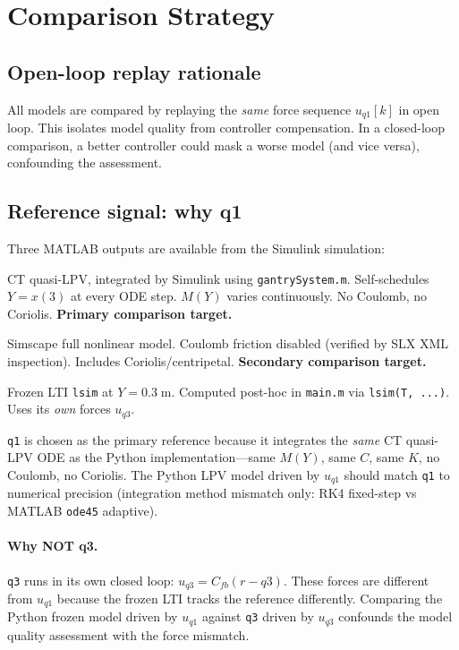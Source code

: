 \documentclass[11pt,a4paper]{article}
\begin{document}
\section{Comparison Strategy}
\label{sec:comparison}

\subsection{Open-loop replay rationale}

All models are compared by replaying the \emph{same} force sequence $u_{q1}[k]$ in open loop.
This isolates model quality from controller compensation. In a closed-loop comparison, a better
controller could mask a worse model (and vice versa), confounding the assessment.

\subsection{Reference signal: why q1}
\label{sec:why_q1}

Three MATLAB outputs are available from the Simulink simulation:

\begin{description}[nosep]
\item[\texttt{q1}] CT quasi-LPV, integrated by Simulink using \texttt{gantrySystem.m}.
  Self-schedules $Y = x(3)$ at every ODE step. $M(Y)$ varies continuously. No Coulomb, no
  Coriolis. \textbf{Primary comparison target.}
\item[\texttt{q}] Simscape full nonlinear model. Coulomb friction disabled (verified by SLX
  XML inspection). Includes Coriolis/centripetal. \textbf{Secondary comparison target.}
\item[\texttt{q3}] Frozen LTI \texttt{lsim} at $Y = 0.3\;\text{m}$. Computed post-hoc in
  \texttt{main.m} via \texttt{lsim(T, ...)}. Uses its \emph{own} forces $u_{q3}$.
\end{description}

\texttt{q1} is chosen as the primary reference because it integrates the \emph{same} CT
quasi-LPV ODE as the Python implementation---same $M(Y)$, same $C$, same $K$, no Coulomb,
no Coriolis. The Python LPV model driven by $u_{q1}$ should match \texttt{q1} to numerical
precision (integration method mismatch only: RK4 fixed-step vs MATLAB \texttt{ode45} adaptive).

\paragraph{Why NOT q3.}
\texttt{q3} runs in its own closed loop: $u_{q3} = C_{fb}(r - q3)$. These forces are
different from $u_{q1}$ because the frozen LTI tracks the reference differently. Comparing
the Python frozen model driven by $u_{q1}$ against \texttt{q3} driven by $u_{q3}$ confounds
the model quality assessment with the force mismatch.
\end{document}
